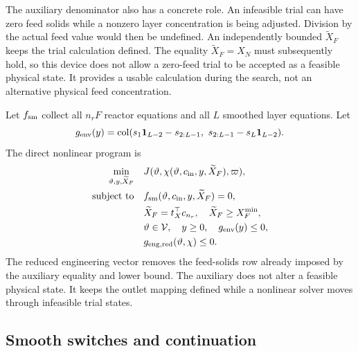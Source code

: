 The auxiliary denominator also has a concrete role. An infeasible trial can have zero feed solids while a nonzero layer concentration is being adjusted. Division by the actual feed value would then be undefined. An independently bounded $\widetilde X_F$ keeps the trial calculation defined. The equality $\widetilde X_F=X_N$ must subsequently hold, so this device does not allow a zero-feed trial to be accepted as a feasible physical state. It provides a usable calculation during the search, not an alternative physical feed concentration.

Let $f_{\rm sm}$ collect all $n_rF$ reactor equations and all $L$ smoothed layer equations. Let
\begin{equation}
\equationname{Interior-layer envelope residuals for direct optimization}
g_{\rm env}(y)=\operatorname{col}
(s_1\mathbf1_{L-2}-s_{2:L-1},\ s_{2:L-1}-s_L\mathbf1_{L-2}).
\end{equation}
The direct nonlinear program is
\begin{equation}
\equationname{Direct mechanistic plant operating optimization problem}
\begin{aligned}
\min_{\vartheta,y,\widetilde X_F}\quad&J(\vartheta,\chi(\vartheta,c_{\rm in},y,\widetilde X_F),\varpi),\\
\text{subject to}\quad&f_{\rm sm}(\vartheta,c_{\rm in},y,\widetilde X_F)=0,\\
&\widetilde X_F=t_X^\top c_{n_r},\quad\widetilde X_F\ge X_F^{\min},\\
&\vartheta\in\mathcal V,\quad y\ge0,\quad g_{\rm env}(y)\le0,\\
&g_{{\rm eng},\rm red}(\vartheta,\chi)\le0.
\end{aligned}
\label{eq:plant_direct_optimization}
\end{equation}
The reduced engineering vector removes the feed-solids row already imposed by the auxiliary equality and lower bound. The auxiliary does not alter a feasible physical state. It keeps the outlet mapping defined while a nonlinear solver moves through infeasible trial states.

\subsection{Smooth switches and continuation}

